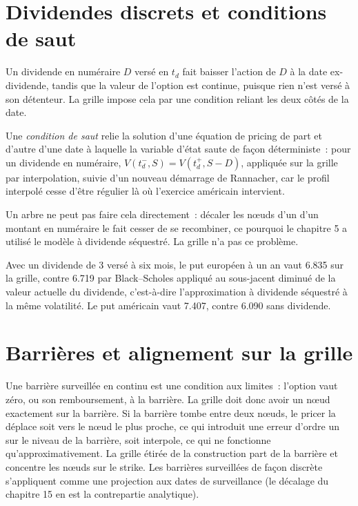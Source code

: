 \section{Dividendes discrets et conditions de saut}

Un dividende en numéraire $D$ versé en $t_d$ fait baisser l'action de $D$ à la date ex-dividende, tandis que la valeur de l'option est continue, puisque rien n'est
versé à son détenteur. La grille impose cela par une condition reliant les deux côtés de la date.

\begin{definition}\label{def:dv:trees-and-finite-difference-pricers-in-practice:jump}
Une \emph{condition de saut} relie la solution d'une équation de pricing de part et d'autre d'une date à laquelle la variable d'état saute
de façon déterministe~: pour un dividende en numéraire, $V(t_d^-,S)=V(t_d^+,S-D)$, appliquée sur la grille par interpolation, suivie d'un nouveau démarrage de
Rannacher, car le profil interpolé cesse d'être régulier là où l'exercice américain intervient.
\end{definition}

Un arbre ne peut pas faire cela directement~: décaler les nœuds d'un  d'un montant en numéraire le fait cesser de se recombiner, ce pourquoi le chapitre 5 a utilisé le
modèle à dividende séquestré. La grille n'a pas ce problème.

\begin{example}\label{ex:dv:trees-and-finite-difference-pricers-in-practice:dividend}
Avec un dividende de 3 versé à six mois, le put européen à un an vaut 6.835 sur la grille, contre 6.719 par Black--Scholes appliqué au sous-jacent
diminué de la valeur actuelle du dividende, c'est-à-dire l'approximation à dividende séquestré à la même volatilité. Le put américain vaut 7.407, contre 6.090
sans dividende.
\end{example}

\section{Barrières et alignement sur la grille}

Une barrière surveillée en continu est une condition aux limites~: l'option vaut zéro, ou son remboursement, à la barrière. La grille doit donc
avoir un nœud exactement sur la barrière. Si la barrière tombe entre deux nœuds, le pricer la déplace soit vers le nœud le plus proche, ce qui introduit une
erreur d'ordre un sur le niveau de la barrière, soit interpole, ce qui ne fonctionne qu'approximativement. La grille étirée de la construction part de la
barrière et concentre les nœuds sur le strike. Les barrières surveillées de façon discrète s'appliquent comme une projection aux dates de surveillance (le
décalage du chapitre 15 en est la contrepartie analytique).

